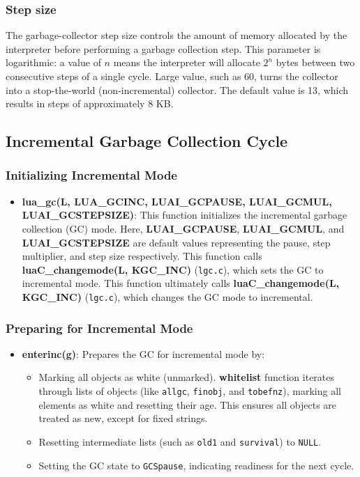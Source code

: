\documentclass[10pt]{article}
\begin{document}
\subsubsection{Step size} \label{sec:step_size}
The garbage-collector step size controls the amount of memory allocated by the interpreter before performing a garbage collection step.
This parameter is logarithmic: a value of \( n \) means the interpreter will allocate \( 2^n \) bytes between two consecutive steps of a single cycle. Large value, such as 60, turns the collector into a stop-the-world (non-incremental) collector. The default value is 13, which results in steps of approximately 8 KB. 

\subsection{Incremental Garbage Collection Cycle}
\subsubsection{Initializing Incremental Mode}
\begin{itemize}
    \item \textbf{lua\_gc(L, LUA\_GCINC, LUAI\_GCPAUSE, LUAI\_GCMUL, LUAI\_GCSTEPSIZE)}: This function initializes the incremental garbage collection (GC) mode. Here, \textbf{LUAI\_GCPAUSE}, \textbf{LUAI\_GCMUL}, and \textbf{LUAI\_GCSTEPSIZE} are default values representing the pause, step multiplier, and step size respectively. This function calls \textbf{luaC\_changemode(L, KGC\_INC)} (\texttt{lgc.c}), which sets the GC to incremental mode. This function ultimately calls \textbf{luaC\_changemode(L, KGC\_INC)} (\texttt{lgc.c}), which changes the GC mode to incremental.
\end{itemize}

\subsubsection{Preparing for Incremental Mode}
\begin{itemize}
    \item \textbf{enterinc(g)}: Prepares the GC for incremental mode by:
    \begin{itemize}
        \item Marking all objects as white (unmarked). \textbf{whitelist} function iterates through lists of objects (like \texttt{allgc}, \texttt{finobj}, and \texttt{tobefnz}), marking all elements as white and resetting their age. This ensures all objects are treated as new, except for fixed strings.
        \item Resetting intermediate lists (such as \texttt{old1} and \texttt{survival}) to \texttt{NULL}. 
        \item Setting the GC state to \texttt{GCSpause}, indicating readiness for the next cycle.
    \end{itemize}
\end{itemize}
\end{document}
